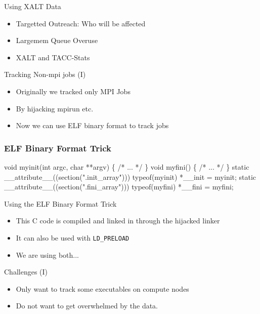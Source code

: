 \documentclass{beamer}
\begin{document}
\begin{frame}{Using XALT Data}
  \begin{itemize}
    \item Targetted Outreach: Who will be affected
    \item Largemem Queue Overuse
    \item XALT and TACC-Stats
  \end{itemize}
\end{frame}

\begin{frame}{Tracking Non-mpi jobs (I)}
  \begin{itemize}
    \item Originally we tracked only MPI Jobs
    \item By hijacking mpirun etc.
    \item Now we can use ELF binary format to track jobs
  \end{itemize}
\end{frame}

\begin{frame}[fragile]
    \frametitle{ELF Binary Format Trick}
 {\small
    \begin{semiverbatim}
void myinit(int argc, char **argv)
\{
  /* ... */
\}
void myfini()
\{
  /* ... */
\}
  static __attribute__((section(".init_array")))
       typeof(myinit) *__init = myinit;
  static __attribute__((section(".fini_array")))
       typeof(myfini) *__fini = myfini;
    \end{semiverbatim}
}
\end{frame}

\begin{frame}{Using the ELF Binary Format Trick}
  \begin{itemize}
    \item This C code is compiled and linked in through the hijacked linker
    \item It can also be used with \texttt{LD\_PRELOAD}
    \item We are using both...
  \end{itemize}
\end{frame}

\begin{frame}{Challenges (I)}
  \begin{itemize}
    \item Only want to track some executables on compute nodes
    \item Do not want to get overwhelmed by the data. 
  \end{itemize}
\end{frame}
\end{document}
